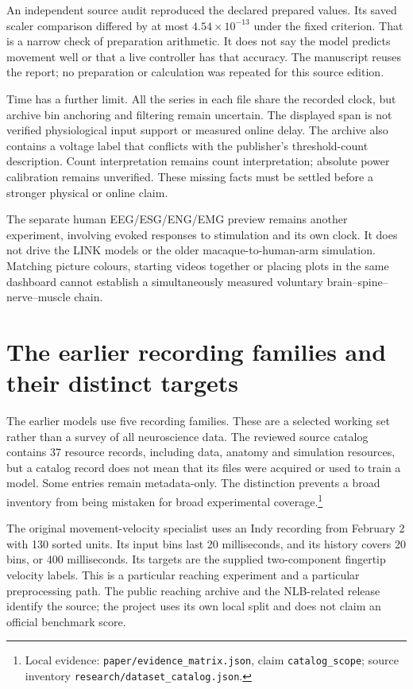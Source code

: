 An independent source audit reproduced the declared prepared values. Its saved
scaler comparison differed by at most $4.54\times10^{-13}$ under the fixed
criterion. That is a narrow check of preparation arithmetic. It does not say
the model predicts movement well or that a live controller has that accuracy.
The manuscript reuses the report; no preparation or calculation was repeated
for this source edition.

Time has a further limit. All the series in each file share the recorded clock,
but archive bin anchoring and filtering remain uncertain. The displayed span
is not verified physiological input support or measured online delay. The
archive also contains a voltage label that conflicts with the publisher's
threshold-count description. Count interpretation remains count interpretation;
absolute power calibration remains unverified. These missing facts must be
settled before a stronger physical or online claim.

The separate human EEG/ESG/ENG/EMG preview remains another experiment, involving
evoked responses to stimulation and its own clock. It does not drive the LINK
models or the older macaque-to-human-arm simulation. Matching picture colours,
starting videos together or placing plots in the same dashboard cannot establish
a simultaneously measured voluntary brain--spine--nerve--muscle chain.


\section{The earlier recording families and their distinct targets}

The earlier models use five recording families. These are a selected working set rather than a survey of all neuroscience data. The reviewed source catalog contains 37 resource records, including data, anatomy and simulation resources, but a catalog record does not mean that its files were acquired or used to train a model. Some entries remain metadata-only. The distinction prevents a broad inventory from being mistaken for broad experimental coverage.\footnote{Local evidence: \texttt{paper/evidence\_matrix.json}, claim \texttt{catalog\_scope}; source inventory \texttt{\mbox{research}/\allowbreak{}\mbox{dataset}\_\allowbreak{}\mbox{catalog}.\allowbreak{}\mbox{json}}.}

The original movement-velocity specialist uses an Indy recording from February 2 with 130 sorted units. Its input bins last 20 milliseconds, and its history covers 20 bins, or 400 milliseconds. Its targets are the supplied two-component fingertip velocity labels. This is a particular reaching experiment and a particular preprocessing path. The public reaching archive and the NLB-related release identify the source; the project uses its own local split and does not claim an official benchmark score.\cite{odoherty2020,nlb2021}

